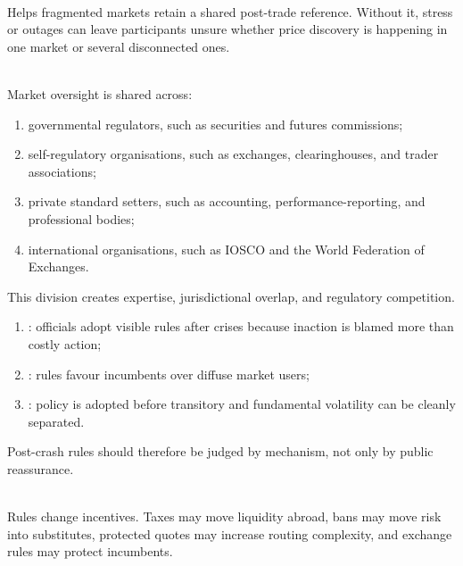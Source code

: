 \begin{principle} \\
Helps fragmented markets retain a shared post-trade reference. Without it, stress or outages can leave participants unsure whether price discovery is happening in one market or several disconnected ones.
\end{principle}

\begin{taxonomy} \\
Market oversight is shared across:
\begin{enumerate}[label=\roman*.]
\setlength{\itemsep}{0pt}
\item governmental regulators, such as securities and futures commissions;
\item self-regulatory organisations, such as exchanges, clearinghouses, and trader associations;
\item private standard setters, such as accounting, performance-reporting, and professional bodies;
\item international organisations, such as IOSCO and the World Federation of Exchanges.
\end{enumerate}
This division creates expertise, jurisdictional overlap, and regulatory competition.
\end{taxonomy}

\begin{taxonomy} 
\begin{enumerate}[label=\roman*.]
\setlength{\itemsep}{0pt}
\item {}: officials adopt visible rules after crises because inaction is blamed more than costly action;
\item {}: rules favour incumbents over diffuse market users;
\item {}: policy is adopted before transitory and fundamental volatility can be cleanly separated.
\end{enumerate}
Post-crash rules should therefore be judged by mechanism, not only by public reassurance.
\end{taxonomy}

\begin{caveat} \\
Rules change incentives. Taxes may move liquidity abroad, bans may move risk into substitutes, protected quotes may increase routing complexity, and exchange rules may protect incumbents.
\end{caveat}

